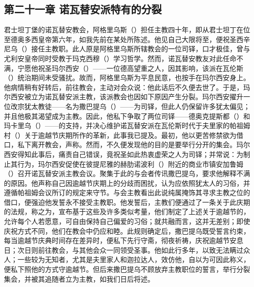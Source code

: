 
\subsection{第二十一章 诺瓦替安派特有的分裂}

君士坦丁堡的诺瓦替安教会，阿格里乌斯（）担任主教四十年，即从君士坦丁在位至德奥多西皇帝第六年，如我先前在某处所陈述。他见自己大限将至，便祝圣西辛尼乌（）接任主教职。此人原是阿格里乌斯所辖教会的一位司铎，口才极佳，曾与尤利安皇帝同时受教于玛克西穆（）学习哲学。然而，诺瓦替安教友对此任命不满，宁愿他祝圣玛尔西安（）——一位德高望重之人，因其影响，该派在瓦伦斯（）统治期间未受骚扰。故而，阿格里乌斯为平息民意，也按手在玛尔西安身上。他病情稍有好转后，前往教会，主动对会众说：他此话后不久便去世了。于是，玛尔西安被立为诺瓦替安派主教，该派教会也因如下原因产生分裂。玛尔西安擢升一位改宗犹太教徒——名为撒巴提乌（）——为司铎，但此人仍保留许多犹太偏见；并且他极其渴望成为主教。因此，他私下争取了两位司铎——德奥克提斯都（）和玛卡里乌（）——的支持，并决心维护诺瓦替安派在瓦伦斯时代于夫里家的帕祖姆村（）关于逾越节庆期所作的革新，此事我已提及。最初，他以更苦修禁欲为借口，私下离开教会，声称。然而，不久便发现他的目的是要举行分开的集会。玛尔西安得知此事后，痛责自己错误，竟祝圣如此热衷虚荣之人为司铎；并常说：为制止其行为，玛尔西安促使在彼提尼雅的赫肋诺波利（）附近的商业市镇安加鲁姆（）召开诺瓦替安派主教会议。聚集于此的与会者传讯撒巴提乌，要求他解释不满的原因。他声称自己因逾越节庆期上的分歧而困扰，认为应依照犹太人的习俗，并遵循帕祖姆会议所订的规定来守节。与会主教看出此说纯属掩饰其寻求主教之位的借口，便强迫他发誓永不接受主教职。他发誓后，主教们便通过了一条关于此庆期的法规，称之为，宣布基于这些及许多类似考量，他们制定了上述关于逾越节的，允许每个人若愿意，可自由保持自己偏爱的习俗；就共融而言，这并无差别；即使庆祝方式不同，他们在教会中仍应和睦。此规则确定后，撒巴提乌既受誓言约束，每当逾越节庆典时间存在差异时，便私下先行守斋，彻夜祈祷，庆祝逾越节安息日；次日则前往教会，与其他会众一同领受圣事。他如此行多年，以致无法瞒过众人；一些较为无知者，尤其是夫里家人和迦拉达人，效仿他，自以为可因此称义，便私下照他的方式守逾越节。但后来撒巴提乌不顾放弃主教职位的誓言，举行分裂集会，并被其追随者立为主教，如我们日后将述。\par

